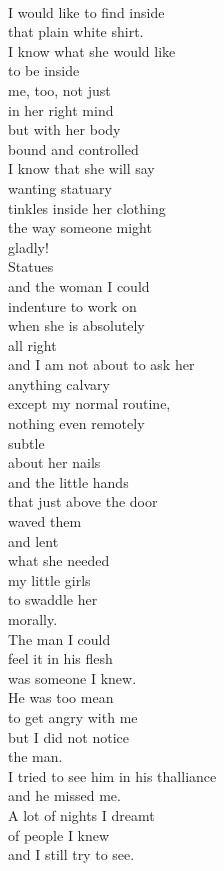 \documentclass[smalldemyvopaper,11pt,twoside,onecolumn,openright,extrafontsizes]{memoir}
\begin{document}
\\I would like to find inside
\\that plain white shirt.
\\I know what she would like
\\to be inside
\\me, too, not just
\\in her right mind
\\but with her body
\\bound and controlled
\\I know that she will say
\\wanting statuary
\\tinkles inside her clothing
\\the way someone might
\\gladly!
\\Statues
\\and the woman I could
\\indenture to work on
\\when she is absolutely
\\all right
\\and I am not about to ask her
\\anything calvary
\\except my normal routine,
\\nothing even remotely
\\subtle
\\about her nails
\\and the little hands
\\that just above the door
\\waved them
\\and lent
\\what she needed
\\my little girls
\\to swaddle her
\\morally.
\\The man I could
\\feel it in his flesh
\\was someone I knew.
\\He was too mean
\\to get angry with me
\\but I did not notice
\\the man.
\\I tried to see him in his thalliance
\\and he missed me.
\\A lot of nights I dreamt
\\of people I knew
\\and I still try to see.
\end{document}
